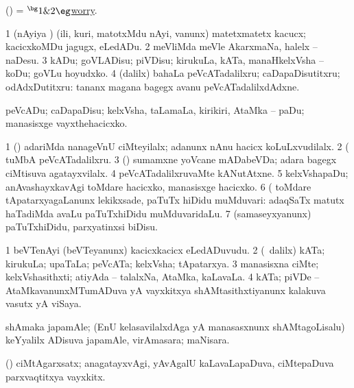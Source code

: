 \bentry
{} 
\expl{}
\bmng
(\AmA) = \hyperlink{worry(1)}{$^\bg1\&2\eg$worry}. 
\emng
\eentry

\bentry 
{} 
\gl{\sakirx}
\expl{}
\bmng
\bnum
\num{1} (nAyiya \vi) (ili, kuri, matotxMdu nAyi, \mo vanunx) matetxmatetx kacucx; kacicxkoMDu jagugx, eLedADu. 
\num{2} meVliMda meVle AkarxmaNa, halelx -- naDesu. 
\num{3} kADu; goVLADisu; piVDisu; kirukuLa, kATa, manaHkelxVsha -- koDu; goVLu hoyudxko. 
\num{4} (\BUkaq dalilx) bahaLa peVcATadalilxru; caDapaDisutitxru; odAdxDutitxru:  tananx magana bagegx avanu peVcATadalilxdAdxne. 
\enum
\emng

\noindent
\gl{\akirx}
\expl{}
\bmng
peVcADu; caDapaDisu; kelxVsha, taLamaLa, kirikiri, AtaMka -- paDu; manasisxge vayxthehacicxko. 
\emng

\noindent
\gl{\pagu}
\expl{}
\bmng
\bnum
\num{1}  (\AmA) adariMda nanageVnU ciMteyilalx; adanunx nAnu hacicx koLuLxvudilalx. 
\num{2}  (  tuMbA peVcATadalilxru. 
\num{3}  (\AmA) sumamxne yoVcane mADabeVDa; adara bagegx ciMtisuva agatayxvilalx. 
\num{4}  peVcATadalilxruvaMte kANutAtxne. 
\num{5}  kelxVshapaDu; anAvashayxkavAgi toMdare hacicxko, manasisxge hacicxko. 
\num{6}  (  toMdare tApatarxyagaLanunx lekikxsade, paTuTx hiDidu muMduvari:  adaqSaTx matutx haTadiMda avaLu paTuTxhiDidu muMduvaridaLu. 
\num{7}  (samaseyxyanunx) paTuTxhiDidu, parxyatinxsi biDisu. 
\enum
\emng
\eentry

\bentry
{}
\gl{\nA}
\bmng
\bnum
\num{1} beVTenAyi (beVTeyanunx) kacicxkacicx eLedADuvudu. 
\num{2} (\sA\ \bava dalilx) kATa; kirukuLa; upaTaLa; peVcATa; kelxVsha; tApatarxya. 
\num{3} manasisxna ciMte; kelxVshasithxti; atiyAda -- talalxNa, AtaMka, kaLavaLa. 
\num{4} kATa; piVDe -- AtaMkavanunxMTumADuva yA vayxkitxya shAMtasithxtiyanunx kalakuva vasutx yA viSaya. 
\enum
\emng
\eentry

\bentry
{} 
\gl{\nA}
\expl{}
\bmng
shAmaka japamAle; (EnU kelasavilalxdAga yA manasasxnunx shAMtagoLisalu) keYyalilx ADisuva japamAle, virAmasara; maNisara. 
\emng
\eentry

\bentry
{} 
\gl{\nA}
\expl{}
\bmng
(\AmA) ciMtAgarxsatx; anagatayxvAgi, yAvAgalU kaLavaLapaDuva, ciMtepaDuva parxvaqtitxya vayxkitx. 
\emng
\eentry

